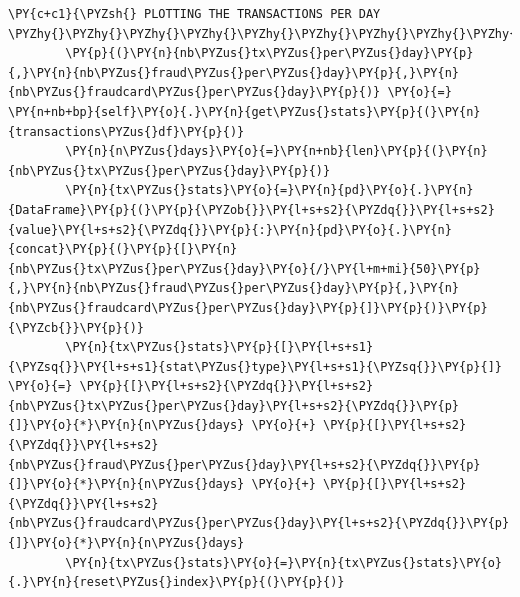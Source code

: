 \begin{tcolorbox}[breakable, size=fbox, boxrule=1pt, pad at break*=1mm,colback=cellbackground, colframe=cellborder]
\begin{Verbatim}[commandchars=\\\{\}]
        \PY{c+c1}{\PYZsh{} PLOTTING THE TRANSACTIONS PER DAY \PYZhy{}\PYZhy{}\PYZhy{}\PYZhy{}\PYZhy{}\PYZhy{}\PYZhy{}\PYZhy{}\PYZhy{}\PYZhy{}\PYZhy{}\PYZhy{}\PYZhy{}\PYZhy{}\PYZhy{}\PYZhy{}\PYZhy{}\PYZhy{}\PYZhy{}\PYZhy{}\PYZhy{}\PYZhy{}\PYZhy{}\PYZhy{}\PYZhy{}\PYZhy{}\PYZhy{}\PYZhy{}\PYZhy{}\PYZhy{}\PYZhy{}\PYZhy{}\PYZhy{}\PYZhy{}\PYZhy{}\PYZhy{}\PYZhy{}\PYZhy{}\PYZhy{}\PYZhy{}\PYZhy{}\PYZhy{}\PYZhy{}\PYZhy{}\PYZhy{}\PYZhy{}\PYZhy{}\PYZhy{}\PYZhy{}\PYZhy{}\PYZhy{}}
        \PY{p}{(}\PY{n}{nb\PYZus{}tx\PYZus{}per\PYZus{}day}\PY{p}{,}\PY{n}{nb\PYZus{}fraud\PYZus{}per\PYZus{}day}\PY{p}{,}\PY{n}{nb\PYZus{}fraudcard\PYZus{}per\PYZus{}day}\PY{p}{)} \PY{o}{=} \PY{n+nb+bp}{self}\PY{o}{.}\PY{n}{get\PYZus{}stats}\PY{p}{(}\PY{n}{transactions\PYZus{}df}\PY{p}{)}
        \PY{n}{n\PYZus{}days}\PY{o}{=}\PY{n+nb}{len}\PY{p}{(}\PY{n}{nb\PYZus{}tx\PYZus{}per\PYZus{}day}\PY{p}{)}
        \PY{n}{tx\PYZus{}stats}\PY{o}{=}\PY{n}{pd}\PY{o}{.}\PY{n}{DataFrame}\PY{p}{(}\PY{p}{\PYZob{}}\PY{l+s+s2}{\PYZdq{}}\PY{l+s+s2}{value}\PY{l+s+s2}{\PYZdq{}}\PY{p}{:}\PY{n}{pd}\PY{o}{.}\PY{n}{concat}\PY{p}{(}\PY{p}{[}\PY{n}{nb\PYZus{}tx\PYZus{}per\PYZus{}day}\PY{o}{/}\PY{l+m+mi}{50}\PY{p}{,}\PY{n}{nb\PYZus{}fraud\PYZus{}per\PYZus{}day}\PY{p}{,}\PY{n}{nb\PYZus{}fraudcard\PYZus{}per\PYZus{}day}\PY{p}{]}\PY{p}{)}\PY{p}{\PYZcb{}}\PY{p}{)}
        \PY{n}{tx\PYZus{}stats}\PY{p}{[}\PY{l+s+s1}{\PYZsq{}}\PY{l+s+s1}{stat\PYZus{}type}\PY{l+s+s1}{\PYZsq{}}\PY{p}{]} \PY{o}{=} \PY{p}{[}\PY{l+s+s2}{\PYZdq{}}\PY{l+s+s2}{nb\PYZus{}tx\PYZus{}per\PYZus{}day}\PY{l+s+s2}{\PYZdq{}}\PY{p}{]}\PY{o}{*}\PY{n}{n\PYZus{}days} \PY{o}{+} \PY{p}{[}\PY{l+s+s2}{\PYZdq{}}\PY{l+s+s2}{nb\PYZus{}fraud\PYZus{}per\PYZus{}day}\PY{l+s+s2}{\PYZdq{}}\PY{p}{]}\PY{o}{*}\PY{n}{n\PYZus{}days} \PY{o}{+} \PY{p}{[}\PY{l+s+s2}{\PYZdq{}}\PY{l+s+s2}{nb\PYZus{}fraudcard\PYZus{}per\PYZus{}day}\PY{l+s+s2}{\PYZdq{}}\PY{p}{]}\PY{o}{*}\PY{n}{n\PYZus{}days}
        \PY{n}{tx\PYZus{}stats}\PY{o}{=}\PY{n}{tx\PYZus{}stats}\PY{o}{.}\PY{n}{reset\PYZus{}index}\PY{p}{(}\PY{p}{)}
    

\end{Verbatim}
\end{tcolorbox}
